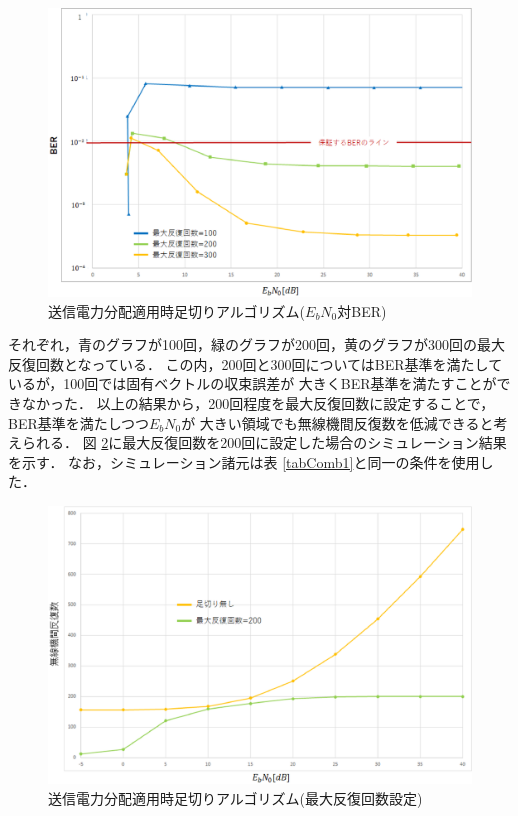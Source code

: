 \begin{figure}[t]
    \centering
    \includegraphics[width=0.95\linewidth]{chapter4/figure/CombSim3.eps}
    \caption{送信電力分配適用時足切りアルゴリズム($E_bN_0$対BER)}
    \label{figCombSim3}
\end{figure}

それぞれ，青のグラフが100回，緑のグラフが200回，黄のグラフが300回の最大反復回数となっている．
この内，200回と300回についてはBER基準を満たしているが，100回では固有ベクトルの収束誤差が
大きくBER基準を満たすことができなかった．
以上の結果から，200回程度を最大反復回数に設定することで，BER基準を満たしつつ$E_bN_0$が
大きい領域でも無線機間反復数を低減できると考えられる．
図 \ref{figCombSim4}に最大反復回数を200回に設定した場合のシミュレーション結果を示す．
なお，シミュレーション諸元は表 \ref{tabComb1}と同一の条件を使用した．

\begin{figure}[t]
    \centering
    \includegraphics[width=0.95\linewidth]{chapter4/figure/CombSim4.eps}
    \caption{送信電力分配適用時足切りアルゴリズム(最大反復回数設定)}
    \label{figCombSim4}
\end{figure}

